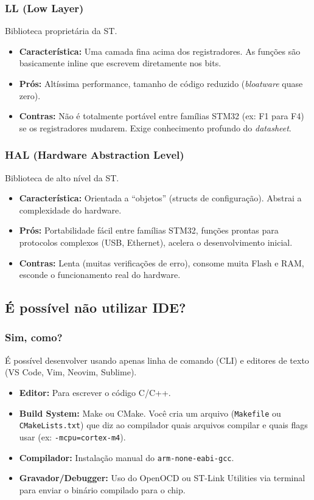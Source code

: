 \documentclass[12pt,a4paper]{article}
\begin{document}
\subsubsection{LL (Low Layer)}
Biblioteca proprietária da ST.
\begin{itemize}
    \item \textbf{Característica:} Uma camada fina acima dos registradores. As funções são basicamente inline que escrevem diretamente nos bits.
    \item \textbf{Prós:} Altíssima performance, tamanho de código reduzido (\textit{bloatware} quase zero).
    \item \textbf{Contras:} Não é totalmente portável entre famílias STM32 (ex: F1 para F4) se os registradores mudarem. Exige conhecimento profundo do \textit{datasheet}.
\end{itemize}

\subsubsection{HAL (Hardware Abstraction Level)}
Biblioteca de alto nível da ST.
\begin{itemize}
    \item \textbf{Característica:} Orientada a ``objetos'' (structs de configuração). Abstrai a complexidade do hardware.
    \item \textbf{Prós:} Portabilidade fácil entre famílias STM32, funções prontas para protocolos complexos (USB, Ethernet), acelera o desenvolvimento inicial.
    \item \textbf{Contras:} Lenta (muitas verificações de erro), consome muita Flash e RAM, esconde o funcionamento real do hardware.
\end{itemize}

\subsection{É possível não utilizar IDE?}
\subsubsection{Sim, como?}
É possível desenvolver usando apenas linha de comando (CLI) e editores de texto (VS Code, Vim, Neovim, Sublime).
\begin{itemize}
    \item \textbf{Editor:} Para escrever o código C/C++.
    \item \textbf{Build System:} Make ou CMake. Você cria um arquivo (\texttt{Makefile} ou \texttt{CMakeLists.txt}) que diz ao compilador quais arquivos compilar e quais flags usar (ex: \texttt{-mcpu=cortex-m4}).
    \item \textbf{Compilador:} Instalação manual do \texttt{arm-none-eabi-gcc}.
    \item \textbf{Gravador/Debugger:} Uso do OpenOCD ou ST-Link Utilities via terminal para enviar o binário compilado para o chip.
\end{itemize}
\end{document}
